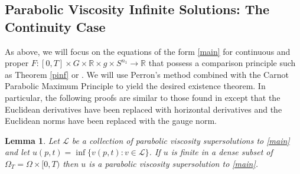 \documentclass[12pt]{amsart}
\newtheorem{lemma}[thm]{Lemma}
\theoremstyle{definition}
\theoremstyle{remark}
\numberwithin{equation}{section}
\begin{document}
\subsection{Parabolic Viscosity Infinite Solutions: The Continuity Case}  As above, we will focus on the equations of the form \eqref{main}
for continuous and proper $F:[0,T]\times G \times \mathbb{R} \times g \times S^{n_1} \to \mathbb{R}$ that possess a comparison principle such as Theorem \ref{pinf} or \cite[Thm. 3.6]{BM}.  We will use Perron's method combined with the Carnot Parabolic Maximum Principle to yield the desired existence theorem.  In particular, the following proofs are similar to those found in \cite[Chapter 2]{Giga} except that the Euclidean derivatives have been replaced with horizontal derivatives and the Euclidean norms have been replaced with the gauge norm.
\begin{lemma}\label{lem1}
Let $\mathcal{L}$ be a collection of parabolic viscosity supersolutions to \eqref{main} and let $u(p,t) = \inf\{v(p,t): v \in \mathcal{L}\}$.  If $u$ is finite in a dense subset of $\Omega_T=\Omega\times [0,T)$ then $u$ is a parabolic viscosity supersolution to \eqref{main}.  
\end{lemma}
\end{document}

